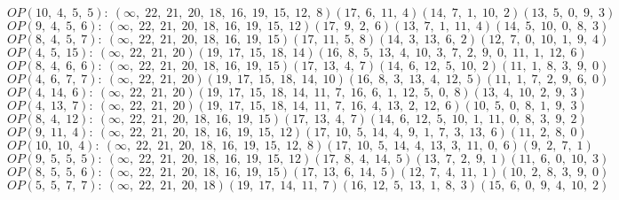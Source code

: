$OP(10, \;4, \;5, \;5): \:(\infty, \;22, \;21, \;20, \;18, \;16, \;19, \;15, \;12, \;8)(17, \;6, \;11, \;4)(14, \;7, \;1, \;10, \;2)(13, \;5, \;0, \;9, \;3)$\\
$OP(9, \;4, \;5, \;6): \:(\infty, \;22, \;21, \;20, \;18, \;16, \;19, \;15, \;12)(17, \;9, \;2, \;6)(13, \;7, \;1, \;11, \;4)(14, \;5, \;10, \;0, \;8, \;3)$\\
$OP(8, \;4, \;5, \;7): \:(\infty, \;22, \;21, \;20, \;18, \;16, \;19, \;15)(17, \;11, \;5, \;8)(14, \;3, \;13, \;6, \;2)(12, \;7, \;0, \;10, \;1, \;9, \;4)$\\
$OP(4, \;5, \;15): \:(\infty, \;22, \;21, \;20)(19, \;17, \;15, \;18, \;14)(16, \;8, \;5, \;13, \;4, \;10, \;3, \;7, \;2, \;9, \;0, \;11, \;1, \;12, \;6)$\\
$OP(8, \;4, \;6, \;6): \:(\infty, \;22, \;21, \;20, \;18, \;16, \;19, \;15)(17, \;13, \;4, \;7)(14, \;6, \;12, \;5, \;10, \;2)(11, \;1, \;8, \;3, \;9, \;0)$\\
$OP(4, \;6, \;7, \;7): \:(\infty, \;22, \;21, \;20)(19, \;17, \;15, \;18, \;14, \;10)(16, \;8, \;3, \;13, \;4, \;12, \;5)(11, \;1, \;7, \;2, \;9, \;6, \;0)$\\
$OP(4, \;14, \;6): \:(\infty, \;22, \;21, \;20)(19, \;17, \;15, \;18, \;14, \;11, \;7, \;16, \;6, \;1, \;12, \;5, \;0, \;8)(13, \;4, \;10, \;2, \;9, \;3)$\\
$OP(4, \;13, \;7): \:(\infty, \;22, \;21, \;20)(19, \;17, \;15, \;18, \;14, \;11, \;7, \;16, \;4, \;13, \;2, \;12, \;6)(10, \;5, \;0, \;8, \;1, \;9, \;3)$\\
$OP(8, \;4, \;12): \:(\infty, \;22, \;21, \;20, \;18, \;16, \;19, \;15)(17, \;13, \;4, \;7)(14, \;6, \;12, \;5, \;10, \;1, \;11, \;0, \;8, \;3, \;9, \;2)$\\
$OP(9, \;11, \;4): \:(\infty, \;22, \;21, \;20, \;18, \;16, \;19, \;15, \;12)(17, \;10, \;5, \;14, \;4, \;9, \;1, \;7, \;3, \;13, \;6)(11, \;2, \;8, \;0)$\\
$OP(10, \;10, \;4): \:(\infty, \;22, \;21, \;20, \;18, \;16, \;19, \;15, \;12, \;8)(17, \;10, \;5, \;14, \;4, \;13, \;3, \;11, \;0, \;6)(9, \;2, \;7, \;1)$\\
$OP(9, \;5, \;5, \;5): \:(\infty, \;22, \;21, \;20, \;18, \;16, \;19, \;15, \;12)(17, \;8, \;4, \;14, \;5)(13, \;7, \;2, \;9, \;1)(11, \;6, \;0, \;10, \;3)$\\
$OP(8, \;5, \;5, \;6): \:(\infty, \;22, \;21, \;20, \;18, \;16, \;19, \;15)(17, \;13, \;6, \;14, \;5)(12, \;7, \;4, \;11, \;1)(10, \;2, \;8, \;3, \;9, \;0)$\\
$OP(5, \;5, \;7, \;7): \:(\infty, \;22, \;21, \;20, \;18)(19, \;17, \;14, \;11, \;7)(16, \;12, \;5, \;13, \;1, \;8, \;3)(15, \;6, \;0, \;9, \;4, \;10, \;2)$\\
